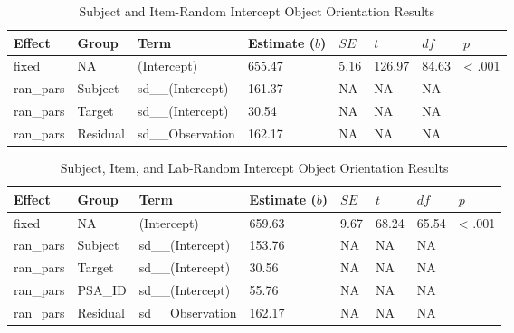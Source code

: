 \documentclass[
  man,floatsintext]{apa7}
\begin{document}
\begin{table}[tbp]

\begin{center}
\begin{threeparttable}

\caption{\label{tab:item}Subject and Item-Random Intercept Object Orientation Results}

\begin{tabular}{llllllll}
\toprule
Effect & Group & Term & Estimate ($b$) & $SE$ & $t$ & $df$ & $p$\\
\midrule
fixed & NA & (Intercept) & 655.47 & 5.16 & 126.97 & 84.63 & < .001\\
ran\_pars & Subject & sd\_\_(Intercept) & 161.37 & NA & NA & NA & \\
ran\_pars & Target & sd\_\_(Intercept) & 30.54 & NA & NA & NA & \\
ran\_pars & Residual & sd\_\_Observation & 162.17 & NA & NA & NA & \\
\bottomrule
\end{tabular}

\end{threeparttable}
\end{center}

\end{table}

\begin{table}[tbp]

\begin{center}
\begin{threeparttable}

\caption{\label{tab:lab}Subject, Item, and Lab-Random Intercept Object Orientation Results}

\begin{tabular}{llllllll}
\toprule
Effect & Group & Term & Estimate ($b$) & $SE$ & $t$ & $df$ & $p$\\
\midrule
fixed & NA & (Intercept) & 659.63 & 9.67 & 68.24 & 65.54 & < .001\\
ran\_pars & Subject & sd\_\_(Intercept) & 153.76 & NA & NA & NA & \\
ran\_pars & Target & sd\_\_(Intercept) & 30.56 & NA & NA & NA & \\
ran\_pars & PSA\_ID & sd\_\_(Intercept) & 55.76 & NA & NA & NA & \\
ran\_pars & Residual & sd\_\_Observation & 162.17 & NA & NA & NA & \\
\bottomrule
\end{tabular}

\end{threeparttable}
\end{center}

\end{table}
\end{document}
